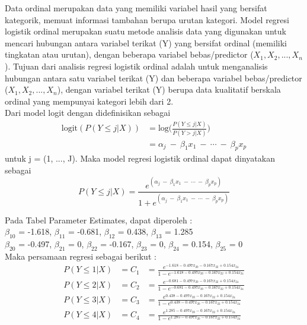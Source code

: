 \begin{sloppypar}
Data ordinal merupakan data yang memiliki variabel hasil yang bersifat kategorik, memuat informasi tambahan berupa urutan kategori. Model regresi logistik ordinal merupakan suatu metode analisis data yang digunakan untuk mencari hubungan antara variabel terikat (Y) yang bersifat ordinal (memiliki tingkatan atau urutan), dengan beberapa variabel bebas/predictor ($X_1, X_2, ..., X_n$). 
Tujuan dari analisis regresi logistik ordinal adalah untuk menganalisis hubungan antara satu variabel terikat (Y) dan beberapa variabel bebas/predictor ($X_1, X_2, ..., X_n$), dengan variabel terikat (Y) berupa data kualitatif berskala ordinal yang mempunyai kategori lebih dari 2.
\\ Dari model logit dengan didefinisikan sebagai 
\begin{equation}
\begin{aligned}
\text{logit}(P(Y \leq j|X)) &= \text{log} \bigg( \frac{P(Y \leq j|X)}{P(Y > j|X)} \bigg) \\ &= \alpha_j\ -\ \beta_{1} x_1\ -\ \cdots\ -\ \beta_{p} x_p 
\end{aligned}
\end{equation}
untuk j = (1, ..., J). Maka model regresi logistik ordinal dapat dinyatakan sebagai
\begin{equation}
P(Y \leq j|X) = \frac{e^{(\alpha_j\ -\ \beta_{1} x_1\ -\ \cdots\ -\ \beta_{p} x_p)}}{1 + e^{(\alpha_j\ -\ \beta_{1} x_1\ -\ \cdots\ -\ \beta_{p} x_p)}}
\end{equation}
\end{sloppypar}
\begin{test}{
    Pada Tabel Parameter Estimates, dapat diperoleh : \\
    $\beta_{10}$ = -1.618, $\beta_{11}$ = -0.681, $\beta_{12}$ = 0.438, $\beta_{13}$ = 1.285 \\
    $\beta_{20}$ = -0.497, $\beta_{21}$ = 0, $\beta_{22}$ = -0.167, $\beta_{23}$ = 0, $\beta_{24}$ = 0.154, $\beta_{25}$ = 0 \\
    Maka persamaan regresi sebagai berikut : \\
    \begin{equation*}
    \begin{aligned}
        P(Y \leq 1|X) &= C_1 &= \frac{e^{-1.618 - 0.497 x_{20} - 0.167 x_{22} + 0.154 x_{24}}}{1 - e^{-1.618 - 0.497 x_{20} - 0.167 x_{22} + 0.154 x_{24}}} \\
        P(Y \leq 2|X) &= C_2 &= \frac{e^{-0.681 - 0.497 x_{20} - 0.167 x_{22} + 0.154 x_{24}}}{1 - e^{-0.681 - 0.497 x_{20} - 0.167 x_{22} + 0.154 x_{24}}} \\
        P(Y \leq 3|X) &= C_3 &= \frac{e^{0.438 - 0.497 x_{20} - 0.167 x_{22} + 0.154 x_{24}}}{1 - e^{0.438 - 0.497 x_{20} - 0.167 x_{22} + 0.154 x_{24}}} \\
        P(Y \leq 4|X) &= C_4 &= \frac{e^{1.285 - 0.497 x_{20} - 0.167 x_{22} + 0.154 x_{24}}}{1 - e^{1.285 - 0.497 x_{20} - 0.167 x_{22} + 0.154 x_{24}}} \\
    \end{aligned}
    \end{equation*}
}
\end{test}

